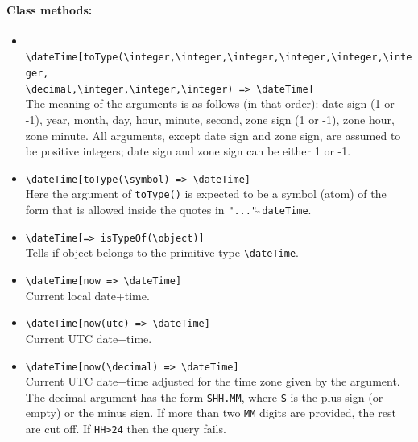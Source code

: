 \documentclass[11pt]{article}
\newcommand{\bs}{\textbackslash}
\begin{document}
\paragraph{Class methods:}
\begin{itemize}
\item {\tt
    \bs{}dateTime[toType(\bs{}integer,\bs{}integer,\bs{}integer,\bs{}integer,\bs{}integer,\bs{}integer,\\
    \bs{}decimal,\bs{}integer,\bs{}integer,\bs{}integer)
    => \bs{}dateTime]} \\
  The meaning of the arguments is as follows (in that order): date sign (1
  or -1), year, month, day, hour, minute, second, zone sign (1 or -1), zone
  hour, zone minute.  All arguments, except date sign and zone sign, are
  assumed to be positive integers; date sign and zone sign can be
  either 1 or -1.
\item {\tt \bs{}dateTime[toType(\bs{}symbol) => \bs{}dateTime]}  \\
  Here the argument of \texttt{toType()} is expected to be  a symbol (atom)
  of the form that is allowed inside the quotes in
  \texttt{"..."$\hat{~}\hat{~}$dateTime}. 
\item {\tt \bs{}dateTime[=> isTypeOf(\bs{}object)]}  \\
  Tells if object belongs to the primitive type {\tt \bs{}dateTime}.
\item \texttt{\bs{}dateTime[now => \bs{}dateTime]} \\
  Current local date+time.
\item \texttt{\bs{}dateTime[now(utc) => \bs{}dateTime]} \\
  Current UTC date+time.
\item \texttt{\bs{}dateTime[now(\bs{}decimal) => \bs{}dateTime]} \\
  Current UTC date+time adjusted for the time zone given by the
  argument.
  The decimal argument has the form \texttt{SHH.MM}, where \texttt{S} is
  the plus sign (or empty) or the minus sign.
  If more than two \texttt{MM} digits are provided, the rest are cut off.
  If \texttt{HH>24} then the query fails. 
\end{itemize}
\end{document}
